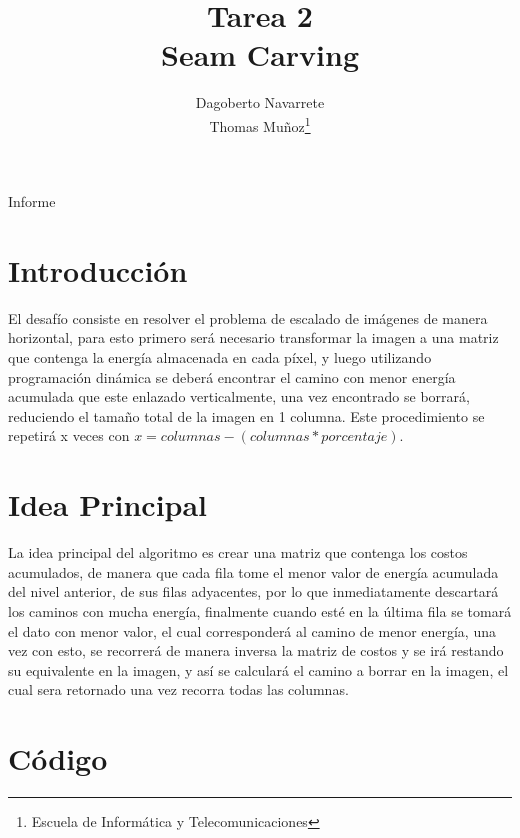 \documentclass[twocolumn,11pts]{IEEEtran}
\begin{document}
\title{Tarea 2\\ Seam Carving}


\author{Dagoberto Navarrete\\Thomas Muñoz\thanks{Escuela de Informática y Telecomunicaciones}%
}

{Informe}
\maketitle
\section{Introducción}
El desafío consiste en resolver el problema de escalado de imágenes de manera horizontal, para esto primero será necesario transformar la imagen a una matriz que contenga la energía almacenada en cada píxel, y luego utilizando programación dinámica se deberá encontrar el camino con menor energía acumulada que este enlazado verticalmente, una vez encontrado se borrará, reduciendo el tamaño total de la imagen en 1 columna. Este procedimiento se repetirá x veces con  $x = columnas - (columnas*porcentaje)$.

\section{Idea Principal}
La idea principal del algoritmo es crear una matriz que contenga los costos acumulados, de manera que cada fila tome el menor valor de energía acumulada del nivel anterior, de sus filas adyacentes, por lo que inmediatamente descartará los caminos con mucha energía, finalmente cuando esté en la última fila se tomará el dato con menor valor, el cual corresponderá  al camino de menor energía, una vez con esto, se recorrerá de manera inversa la matriz de costos y se irá restando su equivalente en la imagen, y así se calculará el camino a borrar en la imagen, el cual sera retornado una vez recorra todas las columnas. %

\section{Código}


\end{document}
